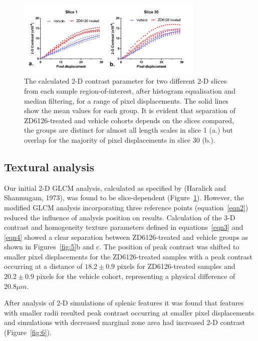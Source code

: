 	
	\begin{figure}%
		\centering
		\includegraphics[width=0.8\textwidth]{spleen_img/spleen_Figure4.jpg}
		\caption{The calculated 2-D contrast parameter for two different 2-D slices from each sample region-of-interest, after histogram equalisation and median filtering, for a range of pixel displacements. The solid lines show the mean values for each group. It is evident that separation of ZD6126-treated and vehicle cohorts depends on the slices compared, the groups are distinct for almost all length scales in slice 1 (a.) but overlap for the majority of pixel displacements in slice 30 (b.). }
		\label{fig:4}
	\end{figure}
	
	\subsection{Textural analysis}
	Our initial 2-D GLCM analysis, calculated as specified by (Haralick and Shanmugam, 1973), 
	was found to be slice-dependent (Figure~\ref{fig:4}). However, the modified GLCM analysis incorporating three reference points (equation~\ref{eqn2}) reduced the influence of analysis position on results. Calculation of the 3-D contrast and homogeneity texture parameters defined in equations~\ref{eqn3} and \ref{eqn4} showed a clear separation between ZD6126-treated and vehicle groups as shown in Figures~\ref{fig:5}b and c. The position of peak contrast was shifted to smaller pixel displacements for the ZD6126-treated samples with a peak contrast occurring at a distance of $18.2 \pm 0.9$ pixels for ZD6126-treated samples and $20.2 \pm 0.9$ pixels for the vehicle cohort, representing a physical difference of $20.8\mu m$.
	
	After analysis of 2-D simulations of splenic features it was found that features with smaller radii resulted peak contrast occurring at smaller pixel displacements and simulations with decreased marginal zone area had increased 2-D contrast (Figure~\ref{fig:6}). 
	
